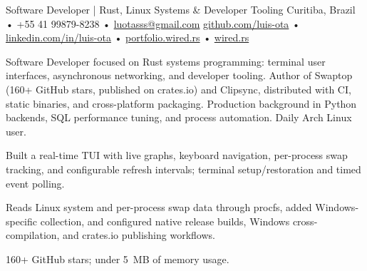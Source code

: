 




\cvheader
  {Software Developer | Rust, Linux Systems \& Developer Tooling}
  {Curitiba, Brazil • +55 41 99879-8238 • \href{mailto:luotasss@gmail.com}{luotasss@gmail.com}}
  {\href{https://github.com/luis-ota}{github.com/luis-ota} • \href{https://linkedin.com/in/luis-ota}{linkedin.com/in/luis-ota} • \href{https://portfolio.wired.rs}{portfolio.wired.rs} • \href{https://wired.rs}{wired.rs}}

Software Developer focused on Rust systems programming: terminal user interfaces, asynchronous networking, and developer tooling. Author of Swaptop (160+ GitHub stars, published on crates.io) and Clipsync, distributed with CI, static binaries, and cross-platform packaging. Production background in Python backends, SQL performance tuning, and process automation. Daily Arch Linux user.



\begin{cvbullets}
  \item Built a real-time TUI with live graphs, keyboard navigation, per-process swap tracking, and configurable refresh intervals; terminal setup/restoration and timed event polling.
  \item Reads Linux system and per-process swap data through procfs, added Windows-specific collection, and configured native release builds, Windows cross-compilation, and crates.io publishing workflows.
  \item 160+ GitHub stars; under 5~MB of memory usage.
\end{cvbullets}


